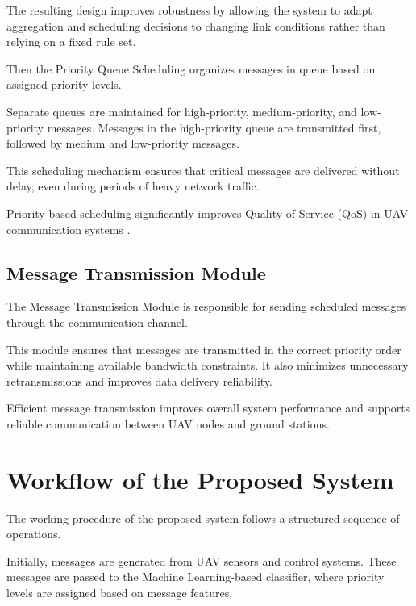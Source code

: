 The resulting design improves robustness by allowing the system to adapt 
aggregation and scheduling decisions to changing link conditions rather 
than relying on a fixed rule set.


Then the Priority Queue Scheduling organizes messages in queue based on assigned priority levels.

Separate queues are maintained for high-priority, medium-priority, 
and low-priority messages. Messages in the high-priority queue are 
transmitted first, followed by medium and low-priority messages.

This scheduling mechanism ensures that critical messages are 
delivered without delay, even during periods of heavy network 
traffic.

Priority-based scheduling significantly improves Quality of 
Service (QoS) in UAV communication systems \cite{rahman2022uavqos}.


\subsection{Message Transmission Module}

The Message Transmission Module is responsible for sending scheduled 
messages through the communication channel.

This module ensures that messages are transmitted in the correct 
priority order while maintaining available bandwidth constraints. 
It also minimizes unnecessary retransmissions and improves data 
delivery reliability.

Efficient message transmission improves overall system performance 
and supports reliable communication between UAV nodes and ground 
stations.


\section{Workflow of the Proposed System}

The working procedure of the proposed system follows a structured 
sequence of operations.

Initially, messages are generated from UAV sensors and control 
systems. These messages are passed to the Machine Learning-based 
classifier, where priority levels are assigned based on message 
features.

